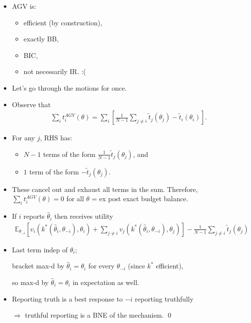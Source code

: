 \documentclass[english]{beamer}		%
\def\lyxframeend{} %
\begin{document}
\begin{itemize}
	\item AGV is:
	\begin{itemize}
		\item efficient (by construction),
		\item exactly BB,
		\item BIC,
		\pause
		\item not necessarily IR. :(
	\end{itemize}
	\item Let's go through the motions for once.
\end{itemize}
\lyxframeend


\begin{itemize}
	\item Observe that
	\vspace{-0.5em}\begin{align*}
	\sum_i t_i^{AGV} (\theta) = \sum_i \left[ \frac{1}{N-1} \sum_{j \neq i} \tilde{t}_j (\theta_j) - \tilde{t}_i (\theta_i) \right].
	\end{align*}\vspace{-1em}
	\item For any $j$, RHS has:
	\begin{itemize}
		\item $N-1$ terms of the form $\frac{1}{N-1} \tilde{t}_j (\theta_j)$, and
		\item $1$ term of the form $-\tilde{t}_j(\theta_j)$.
	\end{itemize}
	\item These cancel out and exhaust all terms in the sum. Therefore, $\sum_i t_i^{AGV} (\theta) = 0$ for all $\theta$ = ex post exact budget balance.
\end{itemize}
\lyxframeend


\begin{itemize}
	\item If $i$ reports $\hat{\theta}_i$ then receives utility
	{\footnotesize 
		\vspace{-0.5em}\begin{align*}
		\mathbb{E}_{\theta_{-i}} \left[ v_i(k^*(\hat{\theta}_i, \theta_{-i}), \theta_i) + \sum_{j \neq i} v_j(k^*(\hat{\theta}_i, \theta_{-i}), \theta_j) \right] - \frac{1}{N-1} \sum_{j \neq i} \tilde{t}_j (\theta_j)
	 	\end{align*}\vspace{-1em}
	}
	\item Last term indep of $\hat{\theta}_i$; 
	
	bracket max-d by $\hat{\theta}_i = \theta_i$ for every $\theta_{-i}$ (since $k^*$ efficient), 
	
	so max-d by $\hat{\theta}_i = \theta_i$ in expectation as well.
	
	\item Reporting truth is a best response to $-i$ reporting truthfully 
	
	$\Rightarrow$ truthful reporting is a BNE of the mechanism. \qed
\end{itemize}
\lyxframeend
\end{document}
